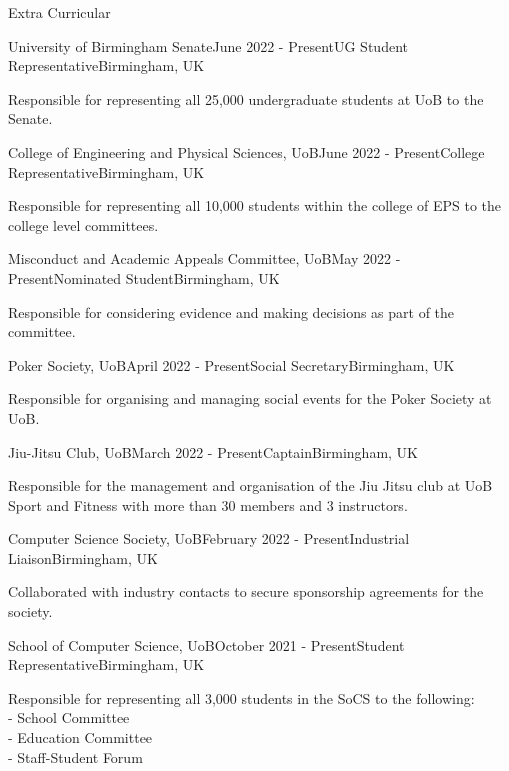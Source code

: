 \documentclass{resume} %
\begin{document}
\begin{rSection}{Extra Curricular}

\begin{rSubsection}{University of Birmingham Senate}{June 2022 - Present}{UG Student Representative}{Birmingham, UK}
\item Responsible for representing all 25,000 undergraduate students at UoB to the Senate. 
\end{rSubsection}

\begin{rSubsection}{College of Engineering and Physical Sciences, UoB}{June 2022 - Present}{College Representative}{Birmingham, UK}
\item Responsible for representing all 10,000 students within the college of EPS to the college level committees. 
\end{rSubsection}

\begin{rSubsection}{Misconduct and Academic Appeals Committee, UoB}{May 2022 - Present}{Nominated Student}{Birmingham, UK}
\item Responsible for considering evidence and making decisions as part of the committee. 
\end{rSubsection}

\begin{rSubsection}{Poker Society, UoB}{April 2022 - Present}{Social Secretary}{Birmingham, UK}
\item Responsible for organising and managing social events for the Poker Society at UoB.
\end{rSubsection}

\begin{rSubsection}{Jiu-Jitsu Club, UoB}{March 2022 - Present}{Captain}{Birmingham, UK}
\item Responsible for the management and organisation of the Jiu Jitsu club at UoB Sport and Fitness with more than 30 members and 3 instructors.
\end{rSubsection}

\begin{rSubsection}{Computer Science Society, UoB}{February 2022 - Present}{Industrial Liaison}{Birmingham, UK}
\item Collaborated with industry contacts to secure sponsorship agreements for the society. 
\end{rSubsection}

\begin{rSubsection}{School of Computer Science, UoB}{October 2021 - Present}{Student Representative}{Birmingham, UK}
\item Responsible for representing all 3,000 students in the SoCS to the following:\\
\hspace*{3mm} - School Committee\\
\hspace*{3mm} - Education Committee\\
\hspace*{3mm} - Staff-Student Forum
\end{rSubsection}

\end{rSection}
\end{document}
